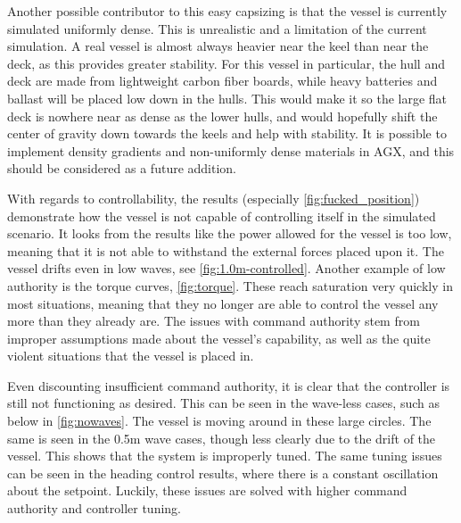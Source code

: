 \documentclass[class=article, crop=false]{standalone}
\begin{document}
Another possible contributor to this easy capsizing is that the vessel is currently simulated uniformly dense. This is unrealistic and a limitation of the current simulation. A real vessel is almost always heavier near the keel than near the deck, as this provides greater stability. For this vessel in particular, the hull and deck are made from lightweight carbon fiber boards, while heavy batteries and ballast will be placed low down in the hulls. This would make it so the large flat deck is nowhere near as dense as the lower hulls, and would hopefully shift the center of gravity down towards the keels and help with stability. It is possible to implement density gradients and non-uniformly dense materials in AGX, and this should be considered as a future addition.

With regards to controllability, the results (especially \cref{fig:fucked_position}) demonstrate how the vessel is not capable of controlling itself in the simulated scenario. It looks from the results like the power allowed for the vessel is too low, meaning that it is not able to withstand the external forces placed upon it. The vessel drifts even in low waves, see \cref{fig:1.0m-controlled}. Another example of low authority is the torque curves, \cref{fig:torque}. These reach saturation very quickly in most situations, meaning that they no longer are able to control the vessel any more than they already are. The issues with command authority stem from improper assumptions made about the vessel's capability, as well as the quite violent situations that the vessel is placed in.

Even discounting insufficient command authority, it is clear that the controller is still not functioning as desired. This can be seen in the wave-less cases, such as below in \cref{fig:nowaves}. The vessel is moving around in these large circles. The same is seen in the 0.5m wave cases, though less clearly due to the drift of the vessel. This shows that the system is improperly tuned. The same tuning issues can be seen in the heading control results, where there is a constant oscillation about the setpoint. Luckily, these issues are solved with higher command authority and controller tuning.
\end{document}
